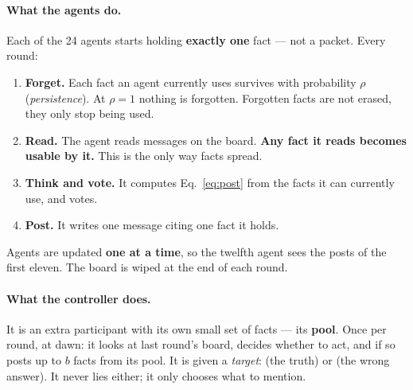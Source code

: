 \documentclass[11pt,a4paper]{article}
\begin{document}
\paragraph{What the agents do.} Each of the 24 agents starts holding
\textbf{exactly one} fact --- not a packet. Every round:
\begin{enumerate}\itemsep1pt
\item \textbf{Forget.} Each fact an agent currently uses survives with
probability $\rho$ (\emph{persistence}). At $\rho=1$ nothing is forgotten.
Forgotten facts are not erased, they only stop being used.
\item \textbf{Read.} The agent reads messages on the board. \textbf{Any fact it
reads becomes usable by it.} This is the only way facts spread.
\item \textbf{Think and vote.} It computes Eq.~\eqref{eq:post} from the facts it
can currently use, and votes.
\item \textbf{Post.} It writes one message citing one fact it holds.
\end{enumerate}
Agents are updated \textbf{one at a time}, so the twelfth agent sees the posts of
the first eleven. The board is wiped at the end of each round.

\paragraph{What the controller does.} It is an extra participant with its own
small set of facts --- its \textbf{pool}. Once per round, at dawn:
it looks at last round's board, decides whether to act, and if so posts up to
$b$ facts from its pool. It is given a \emph{target}:  (the truth) or
 (the wrong answer). It never lies either; it only chooses what to mention.
\end{document}

